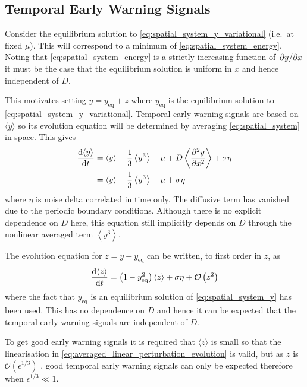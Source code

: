 \subsection{Temporal Early Warning Signals}
Consider the equilibrium solution to \cref{eq:spatial_system_y_variational} (i.e.\ at fixed $\mu$). This will correspond to a minimum
of \cref{eq:spatial_system_energy}. Noting that \cref{eq:spatial_system_energy} is a strictly increasing function of $\pdv*{y}{x}$ it must be the case
that the equilibrium solution is uniform in $x$ and hence independent of $D$.

This motivates setting $y = y_{\mathrm{eq}} + z$ where $y_{\mathrm{eq}}$ is the equilibrium solution to \cref{eq:spatial_system_y_variational}. Temporal
early warning signals are based on $\langle y \rangle$ so its evolution equation will be determined by averaging \cref{eq:spatial_system} in space.
This gives
\begin{align*}
  \dv{\langle y \rangle}{t} &= \langle y \rangle - \frac{1}{3} \left\langle y^3 \right\rangle - \mu + D \left\langle \pdv[2]{y}{x} \right\rangle + \sigma \eta \\
                            &= \langle y \rangle - \frac{1}{3} \left\langle y^3 \right\rangle - \mu + \sigma \eta
\end{align*}
where $\eta$ is noise delta correlated in time only. The diffusive term has vanished due to the periodic boundary conditions. Although there is no explicit dependence on $D$ here,
this equation still implicitly depends on $D$ through the nonlinear averaged term $\left\langle y^3 \right\rangle$.

The evolution equation for $z = y - y_{\mathrm{eq}}$  can be written, to first order in $z$, as
\begin{equation}
  \label{eq:averaged_linear_perturbation_evolution}
  \dv{\langle z\rangle}{t} = \left(1 - y_{\mathrm{eq}}^2\right)\left\langle z \right \rangle + \sigma \eta  + \mathcal{O}\left(z^2 \right)
\end{equation}
where the fact that $y_{\mathrm{eq}}$ is an equilibrium solution of \cref{eq:spatial_system_y} has been used. This has no dependence on
$D$ and hence it can be expected that the temporal early warning signals are independent of $D$.

To get good early warning signals it is required that $\langle z\rangle$ is small so that the linearisation in
\cref{eq:averaged_linear_perturbation_evolution} is valid, but as $z$ is $\mathcal{O}\left(\epsilon^{1/3}\right)$ \parencite{Berglund2006},
good temporal early warning signals can only be expected therefore when $\epsilon^{1/3} \ll 1$.

